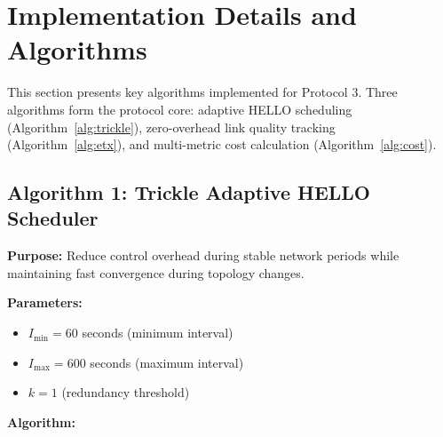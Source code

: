 \section{Implementation Details and Algorithms}
\label{sec:implementation-details}

This section presents key algorithms implemented for Protocol 3. Three algorithms form the protocol core: adaptive HELLO scheduling (Algorithm~\ref{alg:trickle}), zero-overhead link quality tracking (Algorithm~\ref{alg:etx}), and multi-metric cost calculation (Algorithm~\ref{alg:cost}).

\subsection{Algorithm 1: Trickle Adaptive HELLO Scheduler}

\textbf{Purpose:} Reduce control overhead during stable network periods while maintaining fast convergence during topology changes.

\textbf{Parameters:}
\begin{itemize}
\item $I_{\text{min}} = 60$ seconds (minimum interval)
\item $I_{\text{max}} = 600$ seconds (maximum interval)
\item $k = 1$ (redundancy threshold)
\end{itemize}

\textbf{Algorithm:}

